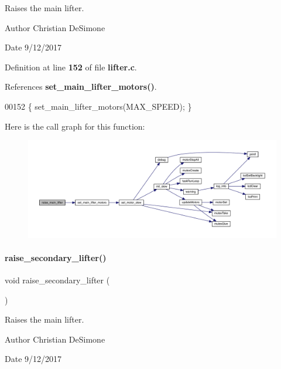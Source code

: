 Raises the main lifter. 

\begin{DoxyAuthor}{Author}
Christian De\+Simone 
\end{DoxyAuthor}
\begin{DoxyDate}{Date}
9/12/2017 
\end{DoxyDate}


Definition at line \textbf{ 152} of file \textbf{ lifter.\+c}.



References \textbf{ set\+\_\+main\+\_\+lifter\+\_\+motors()}.


\begin{DoxyCode}
00152 \{ set_main_lifter_motors(MAX\_SPEED); \}
\end{DoxyCode}
Here is the call graph for this function\+:
\nopagebreak
\begin{figure}[H]
\begin{center}
\leavevmode
\includegraphics[width=350pt]{lifter_8c_a2e2bd38b5b8b52378f3510368bf8aa0a_cgraph}
\end{center}
\end{figure}
\mbox{\label{lifter_8c_a786f679ea48bb8c80e00fbac9a69911b}} 
\paragraph{raise\+\_\+secondary\+\_\+lifter()}
{\footnotesize\ttfamily void raise\+\_\+secondary\+\_\+lifter (\begin{DoxyParamCaption}{ }\end{DoxyParamCaption})}



Raises the main lifter. 

\begin{DoxyAuthor}{Author}
Christian De\+Simone 
\end{DoxyAuthor}
\begin{DoxyDate}{Date}
9/12/2017 
\end{DoxyDate}


